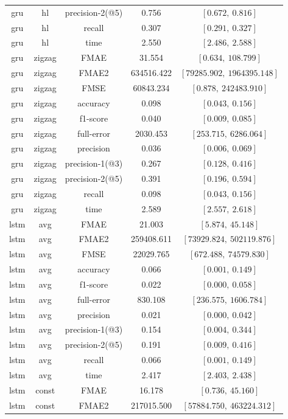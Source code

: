 \begin{center}
\begin{longtable}{|c|c|c|c|c|}
gru & hl & precision-2(@5) & 0.756 & $[0.672,\ 0.816]$ \\
gru & hl & recall & 0.307 & $[0.291,\ 0.327]$ \\
gru & hl & time & 2.550 & $[2.486,\ 2.588]$ \\
\hline
gru & zigzag & FMAE & 31.554 & $[0.634,\ 108.799]$ \\
gru & zigzag & FMAE2 & 634516.422 & $[79285.902,\ 1964395.148]$ \\
gru & zigzag & FMSE & 60843.234 & $[0.878,\ 242483.910]$ \\
gru & zigzag & accuracy & 0.098 & $[0.043,\ 0.156]$ \\
gru & zigzag & f1-score & 0.040 & $[0.009,\ 0.085]$ \\
gru & zigzag & full-error & 2030.453 & $[253.715,\ 6286.064]$ \\
gru & zigzag & precision & 0.036 & $[0.006,\ 0.069]$ \\
gru & zigzag & precision-1(@3) & 0.267 & $[0.128,\ 0.416]$ \\
gru & zigzag & precision-2(@5) & 0.391 & $[0.196,\ 0.594]$ \\
gru & zigzag & recall & 0.098 & $[0.043,\ 0.156]$ \\
gru & zigzag & time & 2.589 & $[2.557,\ 2.618]$ \\
\hline
lstm & avg & FMAE & 21.003 & $[5.874,\ 45.148]$ \\
lstm & avg & FMAE2 & 259408.611 & $[73929.824,\ 502119.876]$ \\
lstm & avg & FMSE & 22029.765 & $[672.488,\ 74579.830]$ \\
lstm & avg & accuracy & 0.066 & $[0.001,\ 0.149]$ \\
lstm & avg & f1-score & 0.022 & $[0.000,\ 0.058]$ \\
lstm & avg & full-error & 830.108 & $[236.575,\ 1606.784]$ \\
lstm & avg & precision & 0.021 & $[0.000,\ 0.042]$ \\
lstm & avg & precision-1(@3) & 0.154 & $[0.004,\ 0.344]$ \\
lstm & avg & precision-2(@5) & 0.191 & $[0.009,\ 0.416]$ \\
lstm & avg & recall & 0.066 & $[0.001,\ 0.149]$ \\
lstm & avg & time & 2.417 & $[2.403,\ 2.438]$ \\
\hline
lstm & const & FMAE & 16.178 & $[0.736,\ 45.160]$ \\
lstm & const & FMAE2 & 217015.500 & $[57884.750,\ 463224.312]$ \\

\end{longtable}
\end{center}
